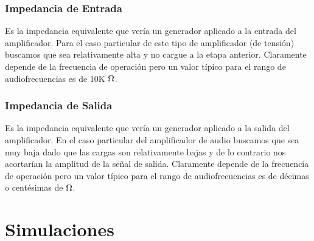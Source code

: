 \documentclass[a4paper,12pt,twoside]{article}
\begin{document}
\subsubsection*{Impedancia de Entrada}


 Es la impedancia equivalente que vería un generador aplicado a la entrada del amplificador. Para el caso particular de este tipo de amplificador (de tensión) buscamos que sea relativamente alta y no cargue a la etapa anterior. Claramente depende de la frecuencia de operación pero un valor típico para el rango de audiofrecuencias es de 10K $\ohm$.
\medskip 
\subsubsection*{Impedancia de Salida}


Es la impedancia equivalente que vería un generador aplicado a la salida del amplificador. En el caso particular del amplificador de audio buscamos que sea muy baja dado que las cargas son relativamente bajas y de lo contrario nos acortarían la amplitud de la señal de salida. Claramente depende de la frecuencia de operación pero un valor típico para el rango de audiofrecuencias es de décimas o centésimas de $\ohm$.


\newpage
\section{Simulaciones}
\end{document}
